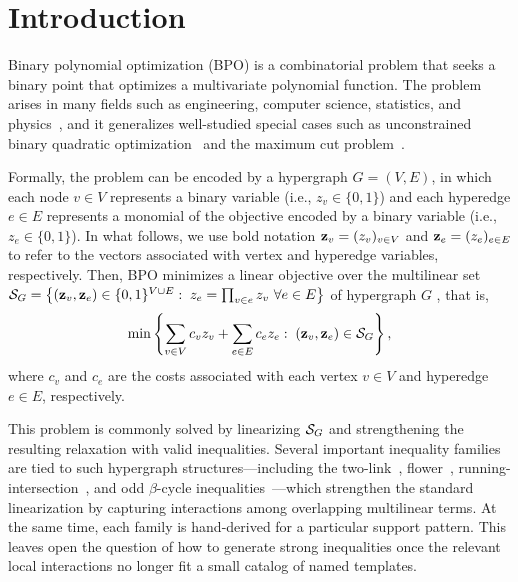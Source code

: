 \section{Introduction}
\label{sec:introduction}

Binary polynomial optimization (BPO) is a combinatorial problem that seeks a binary point that optimizes a multivariate polynomial function. The problem arises in many fields such as engineering, computer science, statistics, and
physics~\cite{barahonaGrotschelJungerReinelt1988,borosHammer2002},
and it generalizes well-studied special cases such as unconstrained binary quadratic
optimization~\cite{kochenberger2014ubqp} and the maximum cut
problem~\cite{barahonaMahjoub1986}.  

Formally, the problem can be encoded by a hypergraph 
$G=(V,E)$, in which each node $v\in V$ represents a binary variable (i.e., $z_v \in \{0,1\}$) and each hyperedge $e\in E$ represents a monomial of the objective encoded by a binary variable (i.e., $z_e \in \{0,1\}$). In what follows, we use bold notation $\mathbf{z}_v= (z_v)_{v\in V}$ and $\mathbf{z}_e= (z_e)_{e\in E}$ to refer to the vectors associated with vertex and hyperedge variables, respectively. Then, BPO minimizes a linear objective over the multilinear set $\mathcal{S}_G = \left\{(\mathbf{z}_v,\mathbf{z}_e)\in \{0,1\}^{V\cup E} : \;
z_e=\prod_{v\in e} z_v \ \forall e\in E\right\}$ of hypergraph $G$ \cite{del2017polyhedral}, that is,
\begin{equation}\label{model:bpo}
\min \left\{ \sum_{v\in V} c_v z_v + \sum_{e\in E} c_e z_e : \; (\mathbf{z}_v,\mathbf{z}_e) \in \mathcal{S}_G  \right\},
\end{equation}
where \(c_v\) and $c_e$ are the costs associated with each vertex $v \in V$ and hyperedge $e \in E$, respectively.

This problem is commonly solved by linearizing $\mathcal{S}_G$ and strengthening the resulting relaxation with valid inequalities. Several important inequality families are tied to such hypergraph structures---including
the two-link~\cite{cramaRodriguezHeck2017valid}, flower~\cite{delPiaKhajavirad2018acyclic},  running-intersection~\cite{delPiaKhajavirad2021running}, and odd \(\beta\)-cycle
inequalities~\cite{delPiaDiGregorio2021chvatal,delPiaWalter2024simple}---which strengthen the standard linearization by capturing interactions among overlapping multilinear terms. At the same time, each family is hand-derived for a particular support pattern. This leaves open the question of how to generate strong inequalities once the relevant local interactions no longer fit a small catalog of named templates.

